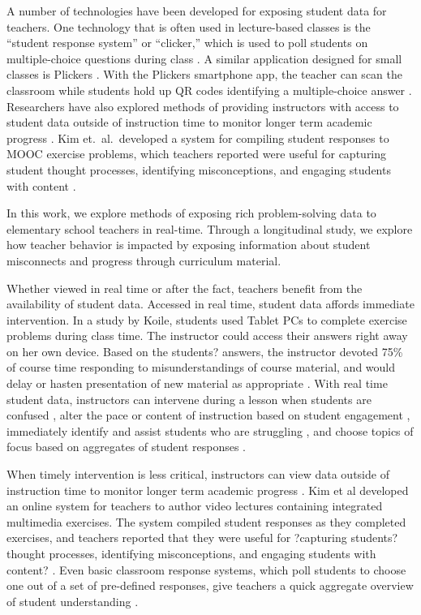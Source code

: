 \documentclass{sigchi}
\begin{document}
A number of technologies have been developed for exposing student data for teachers. One technology that is often used in lecture-based classes is the ``student response system'' or ``clicker,'' which is used to poll students on multiple-choice questions during class \cite{Dangel08, Lazar2007}. A similar application designed for small classes is Plickers \cite{Plickers}. With the Plickers smartphone app, the teacher can scan the classroom while students hold up QR codes identifying a multiple-choice answer \cite{Plickers}. Researchers have also explored methods of providing instructors with access to student data outside of instruction time to monitor longer term academic progress \cite{Zhang2015, Arnold2012}. Kim et.\ al.\ developed a system for compiling student responses to MOOC exercise problems, which teachers reported were useful for capturing student thought processes, identifying misconceptions, and engaging students with content \cite{Kim2015}.

In this work, we explore methods of exposing rich problem-solving data to elementary school teachers in real-time. Through a longitudinal study, we explore how teacher behavior is impacted by exposing information about student misconnects and progress through curriculum material.

Whether viewed in real time or after the fact, teachers benefit from the availability of student data. Accessed in real time, student data affords immediate intervention. In a study by Koile, students used Tablet PCs to complete exercise problems during class time. The instructor could access their answers right away on her own device. Based on the students? answers, the instructor devoted 75\% of course time responding to misunderstandings of course material, and would delay or hasten presentation of new material as appropriate \cite{Koile2006}. With real time student data, instructors can intervene during a lesson when students are confused \cite{Hickey2014}, alter the pace or content of instruction based on student engagement \cite{Balaam2010}, immediately identify and assist students who are struggling \cite{Lazar2007}, and choose topics of focus based on aggregates of student responses \cite{Koile2006}.

When timely intervention is less critical, instructors can view data outside of instruction time to
monitor longer term academic progress \cite{Zhang2015, Arnold2012}. Kim et al developed an online system for teachers to author video lectures containing integrated multimedia exercises. The system compiled student responses as they completed exercises, and teachers reported that they were useful for ?capturing students? thought processes, identifying misconceptions, and engaging students with content? \cite{Kim2015}. Even basic classroom response systems, which poll students to choose one out of a set of pre-defined responses, give teachers a quick aggregate overview of student understanding \cite{Lazar2007}.
\end{document}
